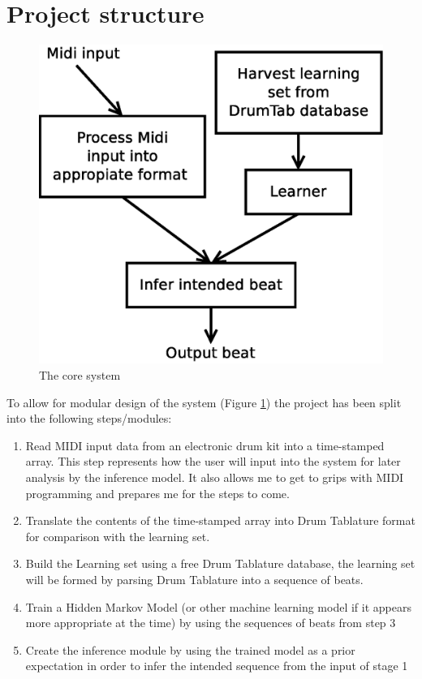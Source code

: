 \documentclass[12pt,a4]{article}
\begin{document}
    \section{\label{sec:ProjectStructure}Project structure}

\begin{figure}[h]
    \centerline{\includegraphics[scale=0.5]{figures/System.eps}}
    \caption{\label{System} The core system}
\end{figure}

To allow for modular design of the system (Figure \ref{System}) the project has been split into the following steps/modules:
        \begin{enumerate}
            \item Read MIDI input data from an electronic drum kit into a time-stamped array. This step represents how the user will input into the system for later analysis by the inference model. It also allows me to get to grips with MIDI programming and prepares me for the steps to come.
            \item Translate the contents of the time-stamped array into Drum Tablature format for comparison with the learning set.
            \item Build the Learning set using a free Drum Tablature database, the learning set will be formed by parsing Drum Tablature into a sequence of beats.
            \item Train a Hidden Markov Model (or other machine learning model if it appears more appropriate at the time) by using the sequences of beats from step 3
            \item Create the inference module by using the trained model as a prior expectation in order to infer the intended sequence from the input of stage 1
        \end{enumerate}
\end{document}
